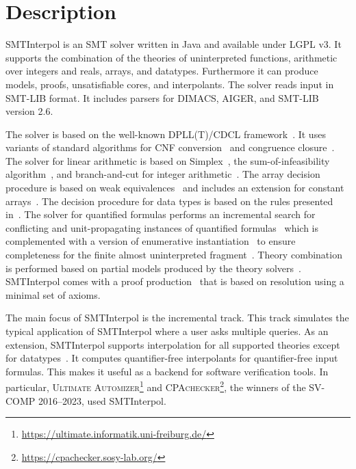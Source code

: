 \documentclass[a4paper]{easychair}
\title{\SI\\{\large Version \version}}
\author{Jochen Hoenicke\inst{1} \and Tanja Schindler\inst{2}}
\institute{
  Certora, \email{jochen@certora.com} \and
  University of Li\`{e}ge, \email{tanja.schindler@uliege.be}
}
\newcommand\SI{SMTInterpol\xspace}
\begin{document}
\maketitle
\section*{Description}
\SI is an SMT solver written in Java and available under LGPL v3.
It supports the combination of the theories of uninterpreted functions, arithmetic over integers and reals, arrays, and datatypes.
Furthermore it can produce models, proofs, unsatisfiable cores, and interpolants.
The solver reads input in SMT-LIB format.
It includes parsers for DIMACS, AIGER, and SMT-LIB version 2.6.

The solver is based on the well-known DPLL(T)/CDCL framework~\cite{DBLP:conf/cav/GanzingerHNOT04}.
It uses variants of standard algorithms for CNF conversion~\cite{DBLP:journals/jsc/PlaistedG86} and congruence closure~\cite{DBLP:conf/rta/NieuwenhuisO05}.
The solver for linear arithmetic is based on Simplex~\cite{DBLP:conf/cav/DutertreM06}, the sum-of-infeasibility algorithm~\cite{DBLP:conf/fmcad/KingBD13}, and branch-and-cut for integer arithmetic~\cite{DBLP:conf/cav/ChristH15,DBLP:conf/cav/DilligDA09}.
The array decision procedure is based on weak equivalences~\cite{DBLP:conf/frocos/ChristH15} and includes an extension for constant arrays~\cite{DBLP:conf/vmcai/HoenickeS19}.
The decision procedure for data types is based on the rules presented in~\cite{DBLP:journals/jsat/BarrettST07}.
The solver for quantified formulas performs an incremental search for conflicting and unit-propagating instances of quantified formulas~\cite{DBLP:conf/vmcai/HoenickeS21} which is complemented with a version of enumerative instantiation~\cite{DBLP:conf/tacas/ReynoldsBF18} to ensure completeness for the finite almost uninterpreted fragment~\cite{DBLP:conf/cav/GeM09}.
Theory combination is performed based on partial models produced by the theory solvers~\cite{DBLP:journals/entcs/MouraB08}.
\SI comes with a proof production~\cite{DBLP:conf/smt/HoenickeS22} that is based on resolution using a minimal set of axioms.

The main focus of \SI is the incremental track.
This track simulates the typical application of \SI where a user asks multiple queries.
As an extension, \SI supports interpolation for all supported theories except for datatypes~\cite{DBLP:journals/jar/ChristH16,DBLP:conf/cade/HoenickeS18,DBLP:conf/vmcai/HoenickeS19,DBLP:conf/smt/HenkelHS21}.  It computes quantifier-free interpolants for quantifier-free input formulas.
This makes it useful as a backend for software verification tools.
In particular, \textsc{Ultimate Automizer}\footnote{\url{https://ultimate.informatik.uni-freiburg.de/}} and \textsc{CPAchecker}\footnote{\url{https://cpachecker.sosy-lab.org/}}, the winners of the SV-COMP 2016--2023, used \SI.
\end{document}
